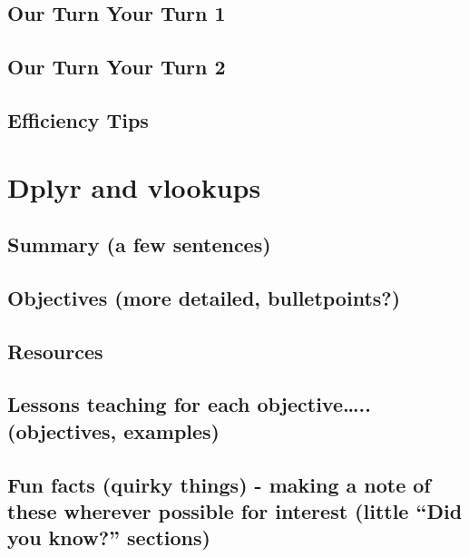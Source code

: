 \documentclass[]{book}
\begin{document}
\hypertarget{our-turn-your-turn-1-3}{%
\section{Our Turn Your Turn 1}\label{our-turn-your-turn-1-3}}

\hypertarget{our-turn-your-turn-2-3}{%
\section{Our Turn Your Turn 2}\label{our-turn-your-turn-2-3}}

\hypertarget{efficiency-tips-3}{%
\section{Efficiency Tips}\label{efficiency-tips-3}}

\hypertarget{vlookup}{%
\chapter{Dplyr and vlookups}\label{vlookup}}

\hypertarget{summary-a-few-sentences-4}{%
\section{Summary (a few sentences)}\label{summary-a-few-sentences-4}}

\hypertarget{objectives-more-detailed-bulletpoints-4}{%
\section{Objectives (more detailed, bulletpoints?)}\label{objectives-more-detailed-bulletpoints-4}}

\hypertarget{resources-4}{%
\section{Resources}\label{resources-4}}

\hypertarget{lessons-teaching-for-each-objective..-objectives-examples-3}{%
\section{Lessons teaching for each objective\ldots{}.. (objectives, examples)}\label{lessons-teaching-for-each-objective..-objectives-examples-3}}

\hypertarget{fun-facts-quirky-things---making-a-note-of-these-wherever-possible-for-interest-little-did-you-know-sections-3}{%
\section{Fun facts (quirky things) - making a note of these wherever possible for interest (little ``Did you know?'' sections)}\label{fun-facts-quirky-things---making-a-note-of-these-wherever-possible-for-interest-little-did-you-know-sections-3}}
\end{document}
